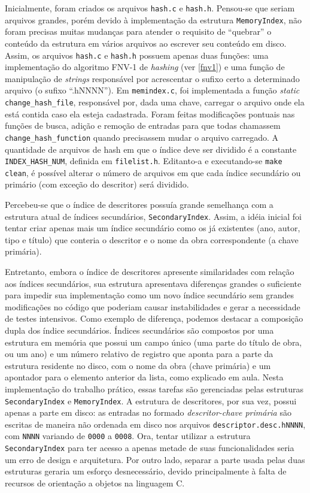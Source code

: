 \documentclass[a4paper,10pt]{article}
\begin{document}
Inicialmente, foram criados os arquivos \texttt{hash.c} e \texttt{hash.h}. Pensou-se que seriam arquivos grandes, porém devido à implementação da estrutura \texttt{MemoryIndex}, não foram precisas muitas mudanças para atender o requisito de ``quebrar'' o conteúdo da estrutura em vários arquivos ao escrever seu conteúdo em disco. Assim, os arquivos \texttt{hash.c} e \texttt{hash.h} possuem apenas duas funções: uma implementação do algoritmo FNV-1 de \textit{hashing} (ver \ref{fnv1}) e uma função de manipulação de \textit{strings} responsável por acrescentar o sufixo certo a determinado arquivo (o sufixo ``.hNNNN''). Em \texttt{memindex.c}, foi implementada a função \textit{static} \texttt{change\_hash\_file}, responsável por, dada uma chave, carregar o arquivo onde ela está contida caso ela esteja cadastrada. Foram feitas modificações pontuais nas funções de busca, adição e remoção de entradas para que todas chamassem \texttt{change\_hash\_function} quando precisassem mudar o arquivo carregado. A quantidade de arquivos de hash em que o índice deve ser dividido é a constante \texttt{INDEX\_HASH\_NUM}, definida em \texttt{filelist.h}. Editanto-a e executando-se \texttt{make clean}, é possível alterar o número de arquivos em que cada índice secundário ou primário (com exceção do descritor) será dividido.

Percebeu-se que o índice de descritores possuía grande semelhança com a estrutura atual de índices secundários, \texttt{SecondaryIndex}. Assim, a idéia inicial foi tentar criar apenas mais um índice secundário como os já existentes (ano, autor, tipo e título) que conteria o descritor e o nome da obra correspondente (a chave primária).

Entretanto, embora o índice de descritores apresente similaridades com relação aos índices secundários, sua estrutura apresentava diferenças grandes o suficiente para impedir sua implementação como um novo índice secundário sem grandes modificações no código que poderiam causar instabilidades e gerar a necessidade de testes intensivos. Como exemplo de diferença, podemos destacar a composição dupla dos índice secundários. Índices secundários são compostos por uma estrutura em memória que possui um campo único (uma parte do título de obra, ou um ano) e um número relativo de registro que aponta para a parte da estrutura residente no disco, com o nome da obra (chave primária) e um apontador para o elemento anterior da lista, como explicado em aula. Nesta implementação do trabalho prático, essas tarefas são gerenciadas pelas estruturas \texttt{SecondaryIndex} e \texttt{MemoryIndex}. A estrutura de descritores, por sua vez, possui apenas a parte em disco: as entradas no formado \textit{descritor-chave primária} são escritas de maneira não ordenada em disco nos arquivos \texttt{descriptor.desc.hNNNN}, com \texttt{NNNN} variando de \texttt{0000} a \texttt{0008}. Ora, tentar utilizar a estrutura \texttt{SecondaryIndex} para ter acesso a apenas metade de suas funcionalidades seria um erro de design e arquitetura. Por outro lado, separar a parte usada pelas duas estruturas geraria um esforço desnecessário, devido principalmente à falta de recursos de orientação a objetos na linguagem C.
\end{document}
